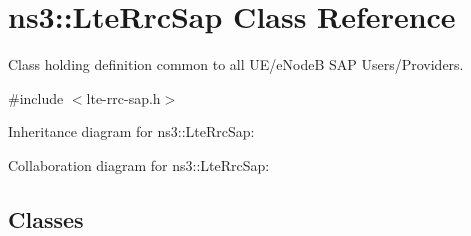 \hypertarget{classns3_1_1LteRrcSap}{}\section{ns3\+:\+:Lte\+Rrc\+Sap Class Reference}
\label{classns3_1_1LteRrcSap}


Class holding definition common to all U\+E/e\+NodeB S\+AP Users/\+Providers.  




{\ttfamily \#include $<$lte-\/rrc-\/sap.\+h$>$}



Inheritance diagram for ns3\+:\+:Lte\+Rrc\+Sap\+:


Collaboration diagram for ns3\+:\+:Lte\+Rrc\+Sap\+:
\subsection*{Classes}
